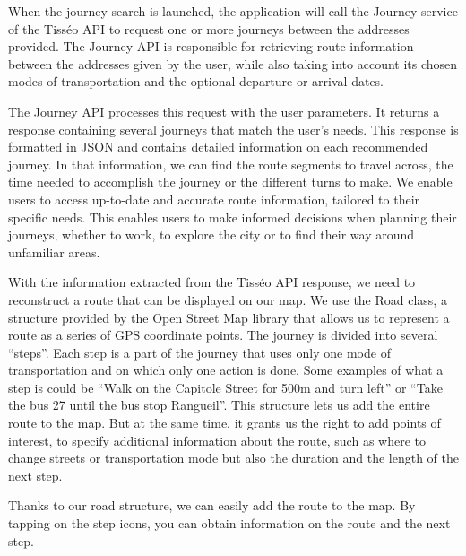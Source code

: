 When the journey search is launched, the application will call the Journey service of the Tisséo API to request one or more journeys between the addresses provided. The Journey API is responsible for retrieving route information between the addresses given by the user, while also taking into account its chosen modes of transportation and the optional departure or arrival dates.


The Journey API processes this request with the user parameters. It returns a response containing several journeys that match the user's needs. This response is formatted in JSON and contains detailed information on each recommended journey. In that information, we can find the route segments to travel across, the time needed to accomplish the journey or the different turns to make. We enable users to access up-to-date and accurate route information, tailored to their specific needs. This enables users to make informed decisions when planning their journeys, whether to work, to explore the city or to find their way around unfamiliar areas.


With the information extracted from the Tisséo API response, we need to reconstruct a route that can be displayed on our map. We use the Road class, a structure provided by the Open Street Map library that allows us to represent a route as a series of GPS coordinate points. The journey is divided into several “steps”. Each step is a part of the journey that uses only one mode of transportation and on which only one action is done. Some examples of what a step is could be “Walk on the Capitole Street for 500m and turn left” or “Take the bus 27 until the bus stop Rangueil”. This structure lets us add the entire route to the map. But at the same time, it grants us the right to add points of interest, to specify additional information about the route, such as where to change streets or transportation mode but also the duration and the length of the next step.


Thanks to our road structure, we can easily add the route to the map. By tapping on the step icons, you can obtain information on the route and the next step.


